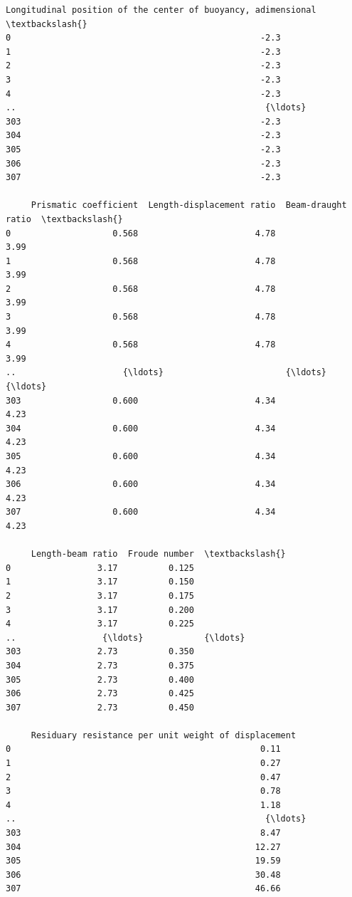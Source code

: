 \documentclass[1pt]{article}
\makeatletter
\newcommand{\boxspacing}{\kern\kvtcb@left@rule\kern\kvtcb@boxsep}
\newcommand{\prompt}[4]{
        {\ttfamily\llap{{\color{#2}[#3]:\hspace{3pt}#4}}\vspace{-\baselineskip}}
}
\makeatother
\begin{document}
    \begin{tcolorbox}[breakable, size=fbox, boxrule=.5pt, pad at break*=1mm, opacityfill=0]
        \prompt{Out}{outcolor}{2}{\boxspacing}
        \begin{Verbatim}[commandchars=\\\{\}]
     Longitudinal position of the center of buoyancy, adimensional  \textbackslash{}
0                                                 -2.3
1                                                 -2.3
2                                                 -2.3
3                                                 -2.3
4                                                 -2.3
..                                                 {\ldots}
303                                               -2.3
304                                               -2.3
305                                               -2.3
306                                               -2.3
307                                               -2.3

     Prismatic coefficient  Length-displacement ratio  Beam-draught ratio  \textbackslash{}
0                    0.568                       4.78                3.99
1                    0.568                       4.78                3.99
2                    0.568                       4.78                3.99
3                    0.568                       4.78                3.99
4                    0.568                       4.78                3.99
..                     {\ldots}                        {\ldots}                 {\ldots}
303                  0.600                       4.34                4.23
304                  0.600                       4.34                4.23
305                  0.600                       4.34                4.23
306                  0.600                       4.34                4.23
307                  0.600                       4.34                4.23

     Length-beam ratio  Froude number  \textbackslash{}
0                 3.17          0.125
1                 3.17          0.150
2                 3.17          0.175
3                 3.17          0.200
4                 3.17          0.225
..                 {\ldots}            {\ldots}
303               2.73          0.350
304               2.73          0.375
305               2.73          0.400
306               2.73          0.425
307               2.73          0.450

     Residuary resistance per unit weight of displacement
0                                                 0.11
1                                                 0.27
2                                                 0.47
3                                                 0.78
4                                                 1.18
..                                                 {\ldots}
303                                               8.47
304                                              12.27
305                                              19.59
306                                              30.48
307                                              46.66


\end{Verbatim}
\end{tcolorbox}
\end{document}
